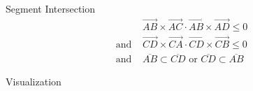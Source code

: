 \documentclass[10pt]{beamer}
\begin{document}
\begin{frame}{Segment Intersection}
	\begin{align*}
					&	\overrightarrow{AB}\times\overrightarrow{AC} \cdot \overrightarrow{AB}\times\overrightarrow{AD} \leq 0 \\
	  \text{and } 	&	\overrightarrow{CD}\times\overrightarrow{CA} \cdot \overrightarrow{CD}\times\overrightarrow{CB} \leq 0 \\
	  \text{and } 	&	\overline{AB} \subset \overline{CD} \text{ or }  \overline{CD}  \subset \overline{AB} 	  	
	\end{align*}

\end{frame}


\begin{frame}{Visualization}
\end{frame}
\end{document}
